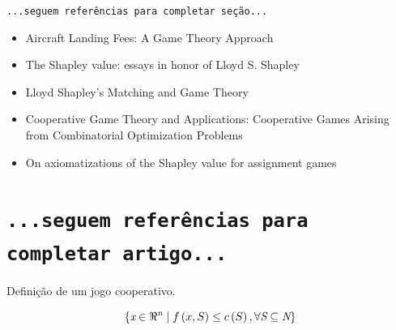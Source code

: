 \documentclass[
	article,			        %
	11pt,				          %
	oneside,			        %
	a4paper,			        %
	english,			        %
	brazil,				        %
	sumario=tradicional
]{abntex2}\usepackage[]{graphicx}\usepackage[]{color}
\begin{document}
  \texttt{\color{red}...seguem referências para completar seção...}
  \begin{itemize}
    \item Aircraft Landing Fees: A Game Theory Approach \cite{Littlechild.1977}
    \item The Shapley value: essays in honor of Lloyd S. Shapley \cite{Alvin.1988}
    \item Lloyd Shapley's Matching and Game Theory \cite{Serrano.2013}
    \item Cooperative Game Theory and Applications: Cooperative Games Arising from Combinatorial Optimization Problems \cite{Curiel.2013}
    \item On axiomatizations of the Shapley value for assignment games \cite{Brink.2015}
  \end{itemize}

\section{\texttt{\color{red}...seguem referências para completar artigo...}}

Definição de um jogo cooperativo.

\begin{equation}
  \label{eq:conceitoTJC}
  \left \{ 
    \emph{x} \in \Re^{\emph{n}} \mid f\left ( x,S \right ) \leq c\left ( S \right ), \forall \emph{S} \subseteq \emph{N}
  \right\}
\end{equation}
\end{document}
